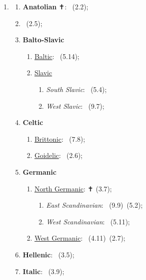 \begin{enumerate}
\begin{enumerate}
    \end{enumerate}
    \item \MakeUppercase{\textbf{\langfamily{\famIndoEuropean}}}
    \begin{enumerate}
        \item \textbf{Anatolian} ✝: \langnameLuwian\ (2.2);
        \item \langnameArmenian\ (2.5);
        \item \textbf{Balto-Slavic}
        \begin{enumerate}
            \item \uline{Baltic}: \langnameLatvian\ (5.14);
            \item \uline{Slavic}
            \begin{enumerate}
                \item \textit{South Slavic}: \langnameBulgarian\ (5.4);
                \item \textit{West Slavic}: \langnameCzech\ (9.7);
            \end{enumerate}
        \end{enumerate}
        \item \textbf{Celtic}
        \begin{enumerate}
            \item \uline{Brittonic}: \langnameWelsh\ (7.8);
            \item \uline{Goidelic}: \langnameIrish\ (2.6);
        \end{enumerate}
        \item \textbf{Germanic}
        \begin{enumerate}
            \item \uline{North Germanic}: \langnameOldNorse{} ✝ (3.7);
            \begin{enumerate}
                \item \textit{East Scandinavian}: \langnameDanish\ (9.9)\EnumComma\langnameSwedish\ (5.2);
                \item \textit{West Scandinavian}: \langnameNorwegian\ (5.11);
            \end{enumerate}
            \item \uline{West Germanic}: \langnameDutch\ (4.11)\EnumComma\langnameEnglish\ (2.7);
        \end{enumerate}
        \item \textbf{Hellenic}: \langnameGreek\ (3.5);
        \item \textbf{Italic}: \langnameLigurian\ (3.9);

\end{enumerate}
\end{enumerate}
